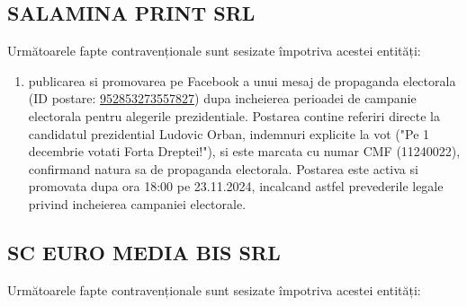 \documentclass[a4paper,12pt]{article}
\begin{document}
\vspace{0.5cm}

\subsection{SALAMINA PRINT SRL}
Următoarele fapte contravenționale sunt sesizate împotriva acestei entități:

\begin{enumerate}[leftmargin=*, label=\arabic*.)]
    \item publicarea si promovarea pe Facebook a unui mesaj de propaganda electorala (ID postare: \href{https://www.facebook.com/ads/library/?id=952853273557827}{952853273557827}) dupa incheierea perioadei de campanie electorala pentru alegerile prezidentiale. Postarea contine referiri directe la candidatul prezidential Ludovic Orban, indemnuri explicite la vot ("Pe 1 decembrie votati Forta Dreptei!"), si este marcata cu numar CMF (11240022), confirmand natura sa de propaganda electorala. Postarea este activa si promovata dupa ora 18:00 pe 23.11.2024, incalcand astfel prevederile legale privind incheierea campaniei electorale.
\end{enumerate}

\vspace{0.5cm}

\subsection{SC EURO MEDIA BIS SRL}
Următoarele fapte contravenționale sunt sesizate împotriva acestei entități:
\end{document}
